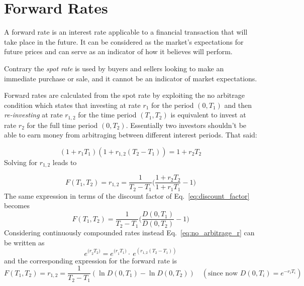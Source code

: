 \section{Forward Rates}
\label{calculating-forward-rates}
A forward rate is an interest rate applicable to a financial transaction that will take place in the future. It can be considered as the market's expectations for future prices and can serve as an indicator of how it believes will perform.

Contrary the \emph{spot rate} is used by buyers and sellers looking to make an immediate purchase or sale, and it cannot be an indicator of market expectations.

Forward rates are calculated from the spot rate by exploiting the no arbitrage condition which states that investing at rate \(r_1\) for the period \((0, T_1)\) and then \emph{re-investing} at rate \(r_{1,2}\) for the time period \((T_1, T_2)\) is equivalent to invest at rate \(r_2\) for the full time period \((0, T_2)\). Essentially two investors shouldn't be able to earn money from arbitraging between different interest periods. That said:

\begin{equation}
(1+r_1 T_1)(1+r_{1,2}(T_2 - T_1)) = 1 + r_2 T_2
\label{eq:no_arbitrage_r}
\end{equation}
Solving for \(r_{1,2}\) leads to

\begin{equation}
F(T_1, T_2) = r_{1,2} = \frac{1}{T_2 - T_1}\Big(\frac{1+r_2 T_2}{1+r_1 T_1} - 1 \Big)
\label{eq:forward_rate_simple}
\end{equation}
\vspace{1cm}
The same expression in terms of the discount factor of Eq.~\ref{eq:discount_factor} becomes
\begin{equation}
F(T_1, T_2) = \frac{1}{T_2 - T_1}\Big(\frac{D(0, T_1)}{D(0, T_2)} - 1 \Big)
\end{equation}
Considering continuously compounded rates instead Eq.~\ref{eq:no_arbitrage_r} can be written as
\begin{equation*}
e^{{(r}_{2}T_{2})}=e^{{(r}_{1}T_{1})}\cdot \ e^{\left(r_{1,2} \left(T_{2}-T_{1}\right)\right)}
\end{equation*}
and the corresponding expression for the forward rate is
\begin{equation}
F(T_1, T_2) = r_{1,2} = \frac {1}{T_{2}-T_{1}}(\ln D(0,T_{1})-\ln D(0,T_{2}))
\quad(\textrm{since now } D(0, T_i)=e^{-r_i T_i})
\label{eq:forward_rate_continous}
\end{equation}

